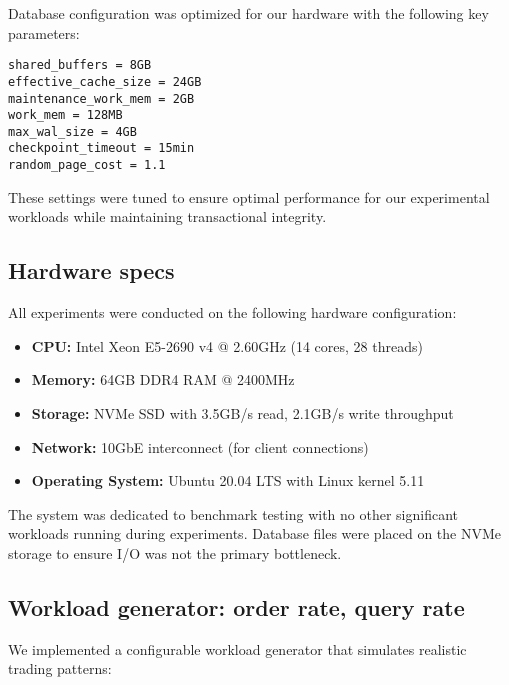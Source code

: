 \documentclass[11pt,a4paper]{article}
\begin{document}
Database configuration was optimized for our hardware with the following key parameters:
\begin{lstlisting}
shared_buffers = 8GB
effective_cache_size = 24GB
maintenance_work_mem = 2GB
work_mem = 128MB
max_wal_size = 4GB
checkpoint_timeout = 15min
random_page_cost = 1.1
\end{lstlisting}

These settings were tuned to ensure optimal performance for our experimental workloads while maintaining transactional integrity.

\subsection{Hardware specs}

All experiments were conducted on the following hardware configuration:

\begin{itemize}
    \item \textbf{CPU:} Intel Xeon E5-2690 v4 @ 2.60GHz (14 cores, 28 threads)
    \item \textbf{Memory:} 64GB DDR4 RAM @ 2400MHz
    \item \textbf{Storage:} NVMe SSD with 3.5GB/s read, 2.1GB/s write throughput
    \item \textbf{Network:} 10GbE interconnect (for client connections)
    \item \textbf{Operating System:} Ubuntu 20.04 LTS with Linux kernel 5.11
\end{itemize}

The system was dedicated to benchmark testing with no other significant workloads running during experiments. Database files were placed on the NVMe storage to ensure I/O was not the primary bottleneck.

\subsection{Workload generator: order rate, query rate}

We implemented a configurable workload generator that simulates realistic trading patterns:
\end{document}
